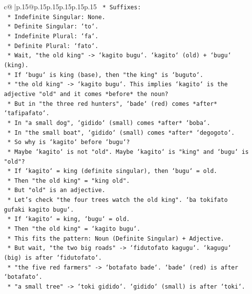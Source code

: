 \documentclass{article}
\begin{document}
{\begin{supertabular}{c@{$\;$}|p{.15\linewidth}@{}p{.15\linewidth}p{.15\linewidth}p{.15\linewidth}p{.15\linewidth}p{.15\linewidth}}
{{{\texttt{        *   Suffixes:} \\
\texttt{            *   Indefinite Singular: None.} \\
\texttt{            *   Definite Singular: `to`.} \\
\texttt{            *   Indefinite Plural: `fa`.} \\
\texttt{            *   Definite Plural: `fato`.} \\
\texttt{    *   Wait, "the old king" {-}> `kagito bugu`. `kagito` (old) + `bugu` (king).} \\
\texttt{    *   If `bugu` is king (base), then "the king" is `buguto`.} \\
\texttt{    *   "the old king" {-}> `kagito bugu`. This implies `kagito` is the adjective "old" and it comes *before* the noun?} \\
\texttt{    *   But in "the three red hunters", `bade` (red) comes *after* `tafipafato`.} \\
\texttt{    *   In "a small dog", `gidido` (small) comes *after* `boba`.} \\
\texttt{    *   In "the small boat", `gidido` (small) comes *after* `degogoto`.} \\
\texttt{    *   So why is `kagito` before `bugu`?} \\
\texttt{    *   Maybe `kagito` is not "old". Maybe `kagito` is "king" and `bugu` is "old"?} \\
\texttt{    *   If `kagito` = king (definite singular), then `bugu` = old.} \\
\texttt{    *   Then "the old king" = "king old".} \\
\texttt{    *   But "old" is an adjective.} \\
\texttt{    *   Let's check "the four trees watch the old king". `ba tokifato gufaki kagito bugu`.} \\
\texttt{    *   If `kagito` = king, `bugu` = old.} \\
\texttt{    *   Then "the old king" = `kagito bugu`.} \\
\texttt{    *   This fits the pattern: Noun (Definite Singular) + Adjective.} \\
\texttt{    *   But wait, "the two big roads" {-}> `fidutofato kagugu`. `kagugu` (big) is after `fidutofato`.} \\
\texttt{    *   "the five red farmers" {-}> `botafato bade`. `bade` (red) is after `botafato`.} \\
\texttt{    *   "a small tree" {-}> `toki gidido`. `gidido` (small) is after `toki`.} \\
}}}
\end{supertabular}}
\end{document}
